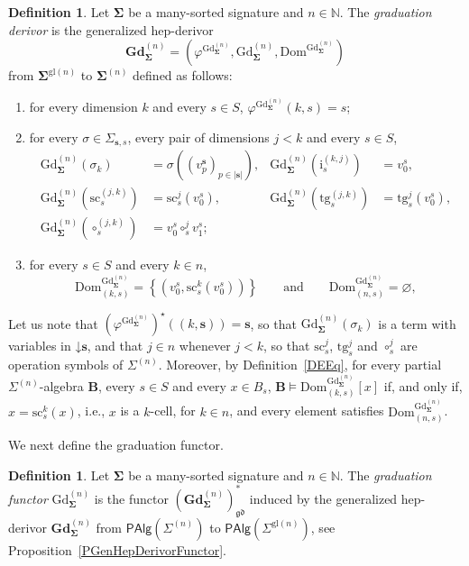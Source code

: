 \documentclass[a4paper, reqno
]{amsart}
\newcommand{\bb}[1]{\ensuremath{\lvert #1 \rvert}}
\newcommand{\vs}[1]{\mathbin{\downarrow}#1}
\newcommand{\sig}[1]{\mathbf{#1}}             %
\newcommand{\Dom}{\mathrm{Dom}}
\newcommand{\gd}{\mathfrak{gd}}              %
\newcommand{\gl}{\mathrm{gl}}                %
\newcommand{\src}{\mathrm{sc}}
\newcommand{\tgt}{\mathrm{tg}}
\newcommand{\Gd}{\mathrm{Gd}}
\newcommand{\bGd}{\mathbf{Gd}}
\theoremstyle{plain}
\theoremstyle{definition}
\newtheorem{definition}[theorem]{Definition}
\begin{document}
\begin{definition}\label{DGradDerivor}
Let $\sig{\Sigma}$ be a many-sorted signature and $n\in\mathbb{N}$.
The \emph{graduation derivor} is the generalized hep-derivor
$$
\bGd^{(n)}_{\sig{\Sigma}}=\left(\varphi^{\Gd^{(n)}_{\sig{\Sigma}}},\Gd^{(n)}_{\sig{\Sigma}},\Dom^{\Gd^{(n)}_{\sig{\Sigma}}}\right)
$$
from $\sig{\Sigma}^{\gl(n)}$ to $\sig{\Sigma}^{(n)}$ defined as follows:
\begin{enumerate}
\item for every dimension $k$ and every $s\in S$, $\varphi^{\Gd^{(n)}_{\sig{\Sigma}}}(k,s)=s$;
\item for every $\sigma\in\Sigma_{\mathbf{s},s}$, every pair of dimensions $j<k$ and every $s\in S$,
\begin{align*}
\Gd^{(n)}_{\sig{\Sigma}}(\sigma_{k})&=\sigma((v^{\mathbf{s}}_{p})_{p\in\bb{\mathbf{s}}}), &
\Gd^{(n)}_{\sig{\Sigma}}(\mathrm{i}^{(k,j)}_{s})&=v^{s}_{0},\\
\Gd^{(n)}_{\sig{\Sigma}}(\src^{(j,k)}_{s})&=\src^{j}_{s}(v^{s}_{0}), &
\Gd^{(n)}_{\sig{\Sigma}}(\tgt^{(j,k)}_{s})&=\tgt^{j}_{s}(v^{s}_{0}),\\
\Gd^{(n)}_{\sig{\Sigma}}(\circ^{(j,k)}_{s})&=v^{s}_{0}\circ^{j}_{s}v^{s}_{1};
\end{align*}
\item for every $s\in S$ and every $k\in n$,
$$
\Dom^{\Gd^{(n)}_{\sig{\Sigma}}}_{(k,s)}=\left\lbrace\left(v^{s}_{0},\src^{k}_{s}(v^{s}_{0})\right)\right\rbrace
\qquad\text{and}\qquad
\Dom^{\Gd^{(n)}_{\sig{\Sigma}}}_{(n,s)}=\varnothing,
$$
\end{enumerate}
\end{definition}

Let us note that $(\varphi^{\Gd^{(n)}_{\sig{\Sigma}}})^{\star}((k,\mathbf{s}))=\mathbf{s}$, so that $\Gd^{(n)}_{\sig{\Sigma}}(\sigma_{k})$ is a term with variables in $\vs{\mathbf{s}}$, and that $j\in n$ whenever $j<k$, so that $\src^{j}_{s}$, $\tgt^{j}_{s}$ and $\circ^{j}_{s}$ are operation symbols of $\Sigma^{(n)}$.
Moreover, by Definition~\ref{DEEq}, for every partial $\Sigma^{(n)}$-algebra $\mathbf{B}$, every $s\in S$ and every $x\in B_{s}$, $\mathbf{B}\models\Dom^{\Gd^{(n)}_{\sig{\Sigma}}}_{(k,s)}[x]$ if, and only if, $x=\src^{k}_{s}(x)$, i.e., $x$ is a $k$-cell, for $k\in n$, and every element satisfies $\Dom^{\Gd^{(n)}_{\sig{\Sigma}}}_{(n,s)}$.

We next define the graduation functor.

\begin{definition}\label{DGraduation}
Let $\sig{\Sigma}$ be a many-sorted signature and $n\in\mathbb{N}$.
The \emph{graduation functor} $\Gd^{(n)}_{\sig{\Sigma}}$ is the functor $(\bGd^{(n)}_{\sig{\Sigma}})^{\ast}_{\gd}$ induced by the generalized hep-derivor $\bGd^{(n)}_{\sig{\Sigma}}$ from $\mathsf{PAlg}(\Sigma^{(n)})$ to $\mathsf{PAlg}(\Sigma^{\gl(n)})$, see Proposition~\ref{PGenHepDerivorFunctor}.
\end{definition}
\end{document}
